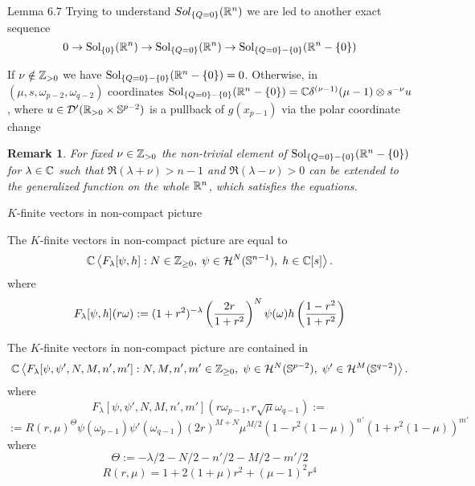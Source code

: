 \documentclass[8pt]{beamer}
\newcommand{\Sol}{\mbox{Sol}}
\theoremstyle{mystyle}
\newtheorem*{remark}{Remark}
\begin{document}
\begin{frame}{Lemma 6.7}
	Trying to understand $Sol_{\left\{Q=0\right\}}(\mathbb{R}^n)$ we are led to another exact sequence
	\[0\rightarrow\Sol_{\mycbra{0}}(\R^n)\rightarrow\Sol_{\mycbra{Q=0}}(\R^n)\rightarrow
	\Sol_{\mycbra{Q=0}-\mycbra{0}}(\R^n-\mycbra{0})\]

\begin{theorem}
	If $\nu\notin\mathbb{Z}_{ >0 }$ we have $\Sol_{\mycbra{Q=0}-\mycbra{0}}(\R^n-\mycbra{0})=0$. Otherwise,
	in $(\mu,s,\omega_{ p-2 },\omega_{ q-2 })$ coordinates\footnotemark
	$\Sol_{\mycbra{Q=0}-\mycbra{0}}(\R^n-\mycbra{0})=\C\delta^{ (\nu-1) }(\mu-1)
	\otimes s^{-\nu }u$, where $u\in\mathcal{ D }'(\mathbb{R}_{ >0 }\times\mathbb{ S }^{ p-2 })$
	is a pullback of $g(x_{ p-1 })$ via the polar coordinate change\footnotemark
\end{theorem}
\begin{remark}
	For fixed $\nu\in\mathbb{Z}_{ >0 }$
	the non-trivial element of $\Sol_{\mycbra{Q=0}-\mycbra{0}}(\R^n-\mycbra{0})$ for $\lambda\in\mathbb{C}$ such that 
	$\Re(\lambda+\nu)>n-1$ and $\Re(\lambda-\nu)>0$ can be extended to the generalized function on the whole $\mathbb{R}^n$,
	which satisfies the equations.
\end{remark}
\end{frame}
\begin{frame}{$K$-finite vectors in non-compact picture}
\begin{theorem}
	The $K$-finite vectors in non-compact picture are equal to
	\[\mathbb{C}\left< F_\lambda[\psi,h]:N\in\mathbb{Z}_{ \geq0 },\;\psi\in\mathcal{ H }^N(\mathbb{ S }^{ n-1 }),\;h\in\mathbb{C}[s] \right>.\]
	where
	\[F_\lambda[\psi,h](r\omega):=(1+r^2)^{ -\lambda }\left( \frac{ 2r }{ 1+r^2 } \right)^N\psi(\omega)h\left(\frac{ 1-r^2 }{1+r^2}\right)\]
\end{theorem}
\begin{theorem}[$O(p,q),\;n:=(p-1)+(q-1)$]
	The $K$-finite vectors in non-compact picture are contained in
	\[\mathbb{C}\left< F_\lambda[\psi,\psi',N,M,n',m']:N,M,n',m'\in\mathbb{Z}_{ \geq0 },
	\;\psi\in\mathcal{ H }^N(\mathbb{ S }^{ p-2 }),\;\psi'\in\mathcal{ H }^M(\mathbb{ S }^{ q-2 }) \right>.\]
	where
	\[F_\lambda[\psi,\psi',N,M,n',m'](r\omega_{ p-1 },r\sqrt{ \mu }\omega_{ q-1 }):=\]
	\[:=R(r,\mu)^\Theta\psi(\omega_{ p-1 })\psi'(\omega_{ q-1 })(2r)^{ M+N }\mu^{ M/2 }(1-r^2(1-\mu))^{ n' }(1+r^2(1-\mu))^
	{m'}\]
	where
	\[\Theta:={ -\lambda/2-N/2-n'/2-M/2-m'/2 }\]
	\[R(r,\mu)=1+2(1+\mu)r^2+(\mu-1)^2r^4\]
\end{theorem}
\end{frame}
\end{document}
